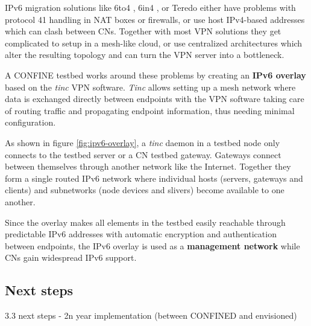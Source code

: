\documentclass[conference]{IEEEtran}
\begin{document}

IPv6 migration solutions like 6to4 \cite{6to4}, 6in4 \cite{6in4},
or Teredo \cite{teredo} either have problems with protocol 41
handling in NAT boxes or firewalls, or use host IPv4-based addresses which can
clash between CNs.  Together with most VPN solutions they get complicated to
setup in a mesh-like cloud, or use centralized architectures which alter the
resulting topology and can turn the VPN server into a bottleneck.




A CONFINE testbed works around these problems by creating an \textbf{IPv6
  overlay} based on the \emph{tinc} \cite{tinc} VPN software.  \emph{Tinc}
allows setting up a mesh network where data is exchanged directly between
endpoints with the VPN software taking care of routing traffic and propagating
endpoint information, thus needing minimal configuration.

As shown in figure \ref{fig:ipv6-overlay}, a \emph{tinc} daemon in a testbed
node only connects to the testbed server or a CN testbed gateway.  Gateways
connect between themselves through another network like the Internet.
Together they form a single routed IPv6 network where individual hosts
(servers, gateways and clients) and subnetworks (node devices and slivers)
become available to one another.

Since the overlay makes all elements in the testbed easily reachable through
predictable IPv6 addresses with automatic encryption and authentication
between endpoints, the IPv6 overlay is used as a \textbf{management network}
while CNs gain widespread IPv6 support.


\subsection{Next steps}
3.3 next steps
- 2n year implementation (between CONFINED and envisioned)
\end{document}
